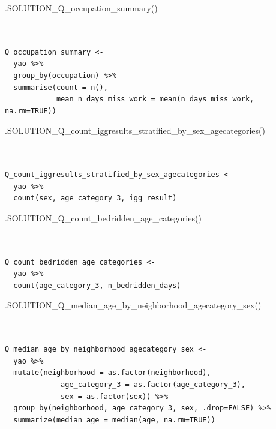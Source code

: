 \documentclass[
  letterpaper,
  DIV=11,
  numbers=noendperiod]{scrreprt}
\newenvironment{Shaded}{\begin{snugshade}}{\end{snugshade}}
\newcommand{\FunctionTok}[1]{\textcolor[rgb]{0.28,0.35,0.67}{#1}}
\newcommand{\NormalTok}[1]{\textcolor[rgb]{0.00,0.23,0.31}{#1}}
\begin{document}
\begin{Shaded}
\begin{Highlighting}[]
\FunctionTok{.SOLUTION\_Q\_occupation\_summary}\NormalTok{()}
\end{Highlighting}
\end{Shaded}

\begin{verbatim}


Q_occupation_summary <- 
  yao %>% 
  group_by(occupation) %>%
  summarise(count = n(),
            mean_n_days_miss_work = mean(n_days_miss_work, na.rm=TRUE))
\end{verbatim}

\begin{Shaded}
\begin{Highlighting}[]
\FunctionTok{.SOLUTION\_Q\_count\_iggresults\_stratified\_by\_sex\_agecategories}\NormalTok{()}
\end{Highlighting}
\end{Shaded}

\begin{verbatim}


Q_count_iggresults_stratified_by_sex_agecategories <- 
  yao %>% 
  count(sex, age_category_3, igg_result)
\end{verbatim}

\begin{Shaded}
\begin{Highlighting}[]
\FunctionTok{.SOLUTION\_Q\_count\_bedridden\_age\_categories}\NormalTok{()}
\end{Highlighting}
\end{Shaded}

\begin{verbatim}


Q_count_bedridden_age_categories <- 
  yao %>% 
  count(age_category_3, n_bedridden_days)
\end{verbatim}

\begin{Shaded}
\begin{Highlighting}[]
\FunctionTok{.SOLUTION\_Q\_median\_age\_by\_neighborhood\_agecategory\_sex}\NormalTok{()}
\end{Highlighting}
\end{Shaded}

\begin{verbatim}


Q_median_age_by_neighborhood_agecategory_sex <- 
  yao %>% 
  mutate(neighborhood = as.factor(neighborhood),
             age_category_3 = as.factor(age_category_3),
             sex = as.factor(sex)) %>%
  group_by(neighborhood, age_category_3, sex, .drop=FALSE) %>%
  summarize(median_age = median(age, na.rm=TRUE))
\end{verbatim}
\end{document}
